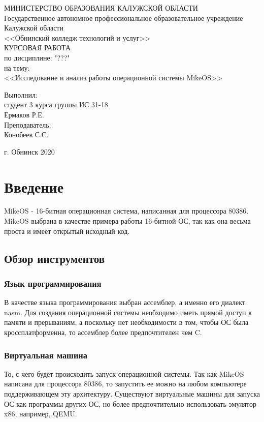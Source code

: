\documentclass[12pt]{article}
\begin{document}
\thispagestyle{empty}
\begin{center}
	МИНИСТЕРСТВО ОБРАЗОВАНИЯ КАЛУЖСКОЙ ОБЛАСТИ
	\\ Государственное автономное профессиональное образовательное учреждение
	\\ Калужской области
	\\ <<Обнинский колледж технологий и услуг>>
	\\ КУРСОВАЯ РАБОТА
	\\ по дисциплине: "???"
	\\ на тему:
	\\ <<Исследование и анализ работы операционной системы MikeOS>>
\end{center}
\begin{flushright}
	Выполнил:
	\\ студент 3 курса группы ИС 31-18
	\\ Ермаков Р.Е.
	\\ Преподаватель:
	\\ Конобеев С.С.
\end{flushright}
\begin{center}
	г. Обнинск 2020
\end{center}

\newpage
\setcounter{page}{1}

\tableofcontents

\newpage

\section{Введение}
	MikeOS - 16-битная операционная система, написанная для процессора 80386.
MikeOS выбрана в качестве примера работы 16-битной ОС, так как она весьма
проста и имеет открытый исходный код.
\subsection{Обзор инструментов}
\subsubsection{Язык программирования}
	В качестве языка программирования выбран ассемблер, а именно его диалект
nasm. Для создания операционной системы необходимо иметь прямой доступ к
памяти и прерываниям, а поскольку нет необходимости в том, чтобы ОС была
кроссплатформенна, то ассемблер более предпочтителен чем C.
\subsubsection{Виртуальная машина}
	То, с чего будет происходить запуск операционной системы. Так как MikeOS
написана для процессора 80386, то запустить ее можно на любом компьютере
поддерживающем эту архитектуру. Существуют виртуальные машины для запуска
ОС как программы других ОС, но более предпочтительно использовать эмулятор
x86, например, QEMU.
\end{document}
